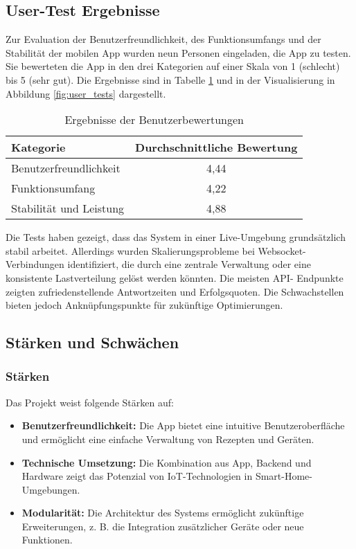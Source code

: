 \subsection{User-Test Ergebnisse}

Zur Evaluation der Benutzerfreundlichkeit, des Funktionsumfangs und der Stabilität der mobilen App 
wurden neun Personen eingeladen, die App zu testen. Sie bewerteten die App in den drei Kategorien 
auf einer Skala von 1 (schlecht) bis 5 (sehr gut). Die Ergebnisse sind in Tabelle 
\ref{tab:user_tests} und in der Visualisierung in Abbildung \ref{fig:user_tests} dargestellt.

\begin{table}[h!]
    \centering
    \begin{tabular}{|l|c|}
        \hline
        \textbf{Kategorie} & \textbf{Durchschnittliche Bewertung} \\
        \hline
        Benutzerfreundlichkeit & 4,44 \\
        Funktionsumfang & 4,22 \\
        Stabilität und Leistung & 4,88 \\
        \hline
    \end{tabular}
    \caption{Ergebnisse der Benutzerbewertungen}
    \label{tab:user_tests}
\end{table}

Die Tests haben gezeigt, dass das System in einer Live-Umgebung grundsätzlich stabil arbeitet. 
Allerdings wurden Skalierungsprobleme bei Websocket-Verbindungen identifiziert, die durch eine 
zentrale Verwaltung oder eine konsistente Lastverteilung gelöst werden könnten. Die meisten API-
Endpunkte zeigten zufriedenstellende Antwortzeiten und Erfolgsquoten. Die Schwachstellen bieten 
jedoch Anknüpfungspunkte für zukünftige Optimierungen.

\subsection{Stärken und Schwächen}

\subsubsection{Stärken}

Das Projekt weist folgende Stärken auf:
\begin{itemize}
  \item \textbf{Benutzerfreundlichkeit:} Die App bietet eine intuitive Benutzeroberfläche und 
  ermöglicht eine einfache Verwaltung von Rezepten und Geräten.
  \item \textbf{Technische Umsetzung:} Die Kombination aus App, Backend und Hardware zeigt das 
  Potenzial von IoT-Technologien in Smart-Home-Umgebungen.
  \item \textbf{Modularität:} Die Architektur des Systems ermöglicht zukünftige Erweiterungen, z. B. 
  die Integration zusätzlicher Geräte oder neue Funktionen.
\end{itemize}


